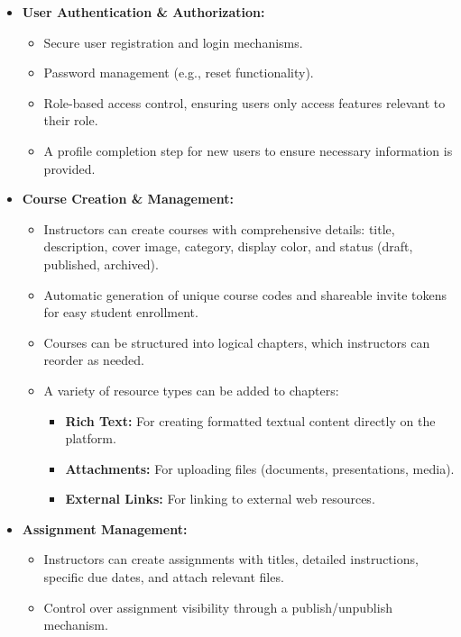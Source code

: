 \documentclass[12pt,a4paper]{article}
\begin{document}
\begin{itemize}
    \item \textbf{User Authentication \& Authorization:}
    \begin{itemize}
        \item Secure user registration and login mechanisms.
        \item Password management (e.g., reset functionality).
        \item Role-based access control, ensuring users only access features relevant to their role.
        \item A profile completion step for new users to ensure necessary information is provided.
    \end{itemize}
    \item \textbf{Course Creation \& Management:}
    \begin{itemize}
        \item Instructors can create courses with comprehensive details: title, description, cover image, category, display color, and status (draft, published, archived).
        \item Automatic generation of unique course codes and shareable invite tokens for easy student enrollment.
        \item Courses can be structured into logical chapters, which instructors can reorder as needed.
        \item A variety of resource types can be added to chapters:
        \begin{itemize}
            \item \textbf{Rich Text:} For creating formatted textual content directly on the platform.
            \item \textbf{Attachments:} For uploading files (documents, presentations, media).
            \item \textbf{External Links:} For linking to external web resources.
        \end{itemize}
    \end{itemize}
    \item \textbf{Assignment Management:}
    \begin{itemize}
        \item Instructors can create assignments with titles, detailed instructions, specific due dates, and attach relevant files.
        \item Control over assignment visibility through a publish/unpublish mechanism.
    \end{itemize}

\end{itemize}
\end{document}
